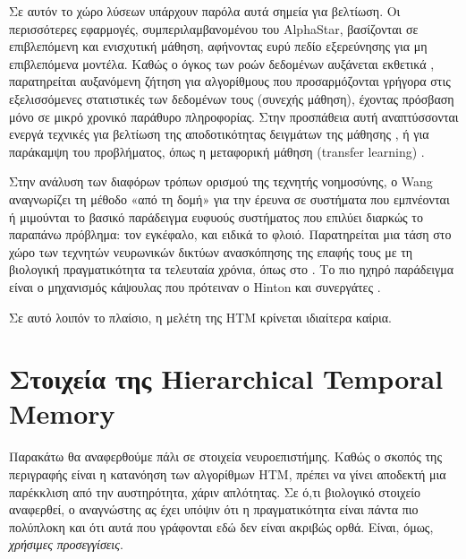 	Σε αυτόν το χώρο λύσεων υπάρχουν παρόλα αυτά σημεία για βελτίωση.
	Οι περισσότερες εφαρμογές, συμπεριλαμβανομένου του AlphaStar, βασίζονται σε επιβλεπόμενη και ενισχυτική μάθηση,
	αφήνοντας ευρύ πεδίο εξερεύνησης για μη επιβλεπόμενα μοντέλα.
	Καθώς ο όγκος των ροών δεδομένων αυξάνεται εκθετικά \parencite{losingIncrementalOnlineLearning2018},
	παρατηρείται αυξανόμενη ζήτηση για αλγορίθμους που προσαρμόζονται γρήγορα στις εξελισσόμενες στατιστικές των δεδομένων τους (συνεχής μάθηση),
	έχοντας πρόσβαση μόνο σε μικρό χρονικό παράθυρο πληροφορίας.
	Στην προσπάθεια αυτή αναπτύσσονται ενεργά τεχνικές για βελτίωση της αποδοτικότητας δειγμάτων της μάθησης \parencite[όπως][]{nachumDataEfficientHierarchicalReinforcement2018},
	ή για παράκαμψη του προβλήματος, όπως η μεταφορική μάθηση (transfer learning) \parencite{xiongApplicationTransferLearning2018}.
	\medskip

	Στην ανάλυση των διαφόρων τρόπων ορισμού της τεχνητής νοημοσύνης, ο Wang \parencite{wangWhatYouMean2008} αναγνωρίζει τη μέθοδο
	«από τη δομή» για την έρευνα σε συστήματα που εμπνέονται ή μιμούνται
	το βασικό παράδειγμα ευφυούς συστήματος που επιλύει διαρκώς το παραπάνω πρόβλημα: τον εγκέφαλο, και ειδικά το φλοιό.
	Παρατηρείται μια τάση στο χώρο των τεχνητών νευρωνικών δικτύων ανασκόπησης της επαφής τους με τη βιολογική πραγματικότητα τα τελευταία χρόνια,
	όπως στο \cite{bengioBiologicallyPlausibleDeep2015}.
	Το πιο ηχηρό παράδειγμα είναι ο μηχανισμός κάψουλας που πρότειναν ο Hinton και συνεργάτες \parencite{sabourMatrixCapsulesEM2018,sabourDynamicRoutingCapsules2017}.
	\smallskip

	Σε αυτό λοιπόν το πλαίσιο, η μελέτη της HTM κρίνεται ιδιαίτερα καίρια.

\section{Στοιχεία της Hierarchical Temporal Memory}

	Παρακάτω θα αναφερθούμε πάλι σε στοιχεία νευροεπιστήμης.
	Καθώς ο σκοπός της περιγραφής είναι η κατανόηση των αλγορίθμων HTM, πρέπει να γίνει αποδεκτή μια παρέκκλιση από την αυστηρότητα, χάριν απλότητας.
	Σε ό,τι βιολογικό στοιχείο αναφερθεί, ο αναγνώστης ας έχει υπόψιν ότι η πραγματικότητα είναι πάντα πιο πολύπλοκη και ότι αυτά που γράφονται εδώ δεν είναι ακριβώς ορθά.
	Είναι, όμως, \textit{χρήσιμες προσεγγίσεις}.

